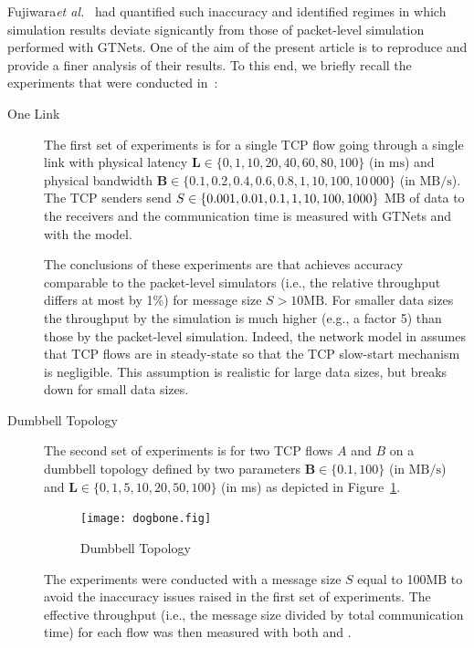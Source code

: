 \documentclass{sig-alternate}
\def\ie{i.e.,\xspace}
\def\eg{e.g.,\xspace}
\def\etal{\emph{et al.}\xspace}
\def\alvinbreak{\discretionary{}{}{}}
\def\ms{\ensuremath{\text{ms}}\xspace}%
\def\MBps{\ensuremath{\text{MB}/\text{s}}\xspace}%
\def\MB{\ensuremath{\text{MB}}\xspace}%
\begin{document}
Fujiwara\etal~\cite{nstools07} had quantified such inaccuracy
and identified regimes in which simulation results deviate signicantly
from those of packet-level simulation performed with GTNets. One of
the aim of the present article is to reproduce and provide a finer
analysis of their results. To this end, we briefly recall the
experiments that were conducted in~\cite{nstools07}:
\def\BOneLink{\ensuremath{\mathbf{B}}\xspace}%
\def\LOneLink{\ensuremath{\mathbf{L}}\xspace}%
\def\BDogbone{\ensuremath{\mathbf{B}}\xspace}%
\def\LDogbone{\ensuremath{\mathbf{L}}\xspace}%
\begin{description}
\item[One Link] The first set of experiments is for a single TCP flow
  going through a single link with physical latency $\LOneLink\in \{0,
  1, 10, 20, 40, 60, 80, 100\}$ (in \ms) and physical bandwidth
  $\BOneLink\in\{0.1, 0.2, 0.4, 0.6, 0.8, 1, 10, 100, 10\,000\}$ (in
  \MBps). The TCP senders send $S\in\{0.001, 0.01, 0.1, \alvinbreak 1,
  10, 100, 1000\}$ \MB of data to the receivers and the communication
  time is measured with GTNets and with the \simgrid model.

  The conclusions of these experiments are that \simgrid achieves
  accuracy comparable to the packet-level simulators (\ie the
  relative throughput differs at most by 1\%) for message size
  $S>10\MB$. For smaller data sizes the throughput by the \simgrid
  simulation is much higher (\eg a factor 5) than those by the
  packet-level simulation.  Indeed, the network model in \simgrid
  assumes that TCP flows are in steady-state so that the 
  TCP slow-start mechanism is negligible. This assumption is realistic
  for large data sizes, but breaks down for small data sizes. 
\item[Dumbbell Topology] The second set of experiments is for two TCP
  flows $A$ and $B$ on a dumbbell topology defined by two parameters
  $\BDogbone\in\{0.1, 100\}$ (in \MBps) and $\LDogbone\in \{0, 1, 5,
  10,20, 50,100\}$ (in ms) as depicted in Figure~\ref{fig:dogbone}.
  \begin{figure}
    \centering
    \texttt{[image: dogbone.fig]}
    \caption{Dumbbell Topology}
    \label{fig:dogbone}
  \end{figure}
  The experiments were conducted with a message size $S$ equal to
  100\MB to avoid the inaccuracy issues raised in the first set of
  experiments. The effective throughput (\ie the message size divided
  by total communication time) for each flow was then measured with
  both \simgrid and \gtnets.


\end{description}
\end{document}
